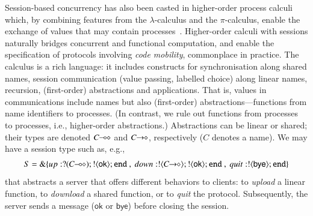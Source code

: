 Session-based concurrency has also been casted in {higher-order} process
calculi which, by combining features from the $\lambda$-calculus and the $\pi$-calculus, 
enable the exchange of values that may contain processes~\cite{tlca07,DBLP:journals/jfp/GayV10}. 
Higher-order calculi with sessions 
naturally bridges concurrent and functional computation, 
and enable the specification of protocols involving \emph{code mobility}, 
commonplace in practice.
The \HOp calculus is a rich language: it
includes
constructs for 
synchronisation along shared names, 
session communication (value passing, labelled choice) along linear names,
recursion, 
 (first-order) abstractions 
 and applications.
 That is, 
 values in communications include names but also (first-order) abstractions---functions from name identifiers to processes. 
 (In contrast, we rule out functions from processes to processes, i.e., higher-order abstractions.)
Abstractions can be linear or shared; their types are  denoted $C\!\! \multimap\!\! \diamond$ and $C\!\! \rightarrow\!\! \diamond$, respectively ($C$ 
denotes a name). We may have a 
session type such as, e.g.,
$$S = \btbra{up:\btinp{\lhot{C}}\btout{\mathsf{ok}}\tinact ~ , ~ down:\btout{\shot{C}}\btout{\mathsf{ok}}\tinact ~ , ~quit:\btout{\mathsf{bye}}\tinact}_{}$$
that abstracts a server that offers different behaviors to clients: 
  to \emph{upload} a linear function, %
  to \emph{download} a shared function, %
   or to \emph{quit} the protocol. Subsequently, 
  the server sends a message ($\mathsf{ok}$ or $\mathsf{bye}$) before closing the session.


